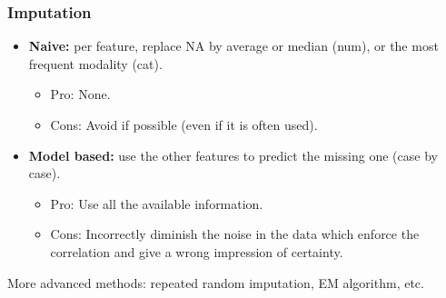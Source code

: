 \begin{frame}
\frametitle{Imputation}
\begin{itemize}
\item {\bf Naive:} per feature, replace NA by average or median (num), or the most frequent modality (cat). 
\begin{itemize}
\item Pro: None.
\item Cons: Avoid if possible (even if it is often used).
\end{itemize}
\item {\bf Model based:} use the other features to predict the missing one (case by case).
\begin{itemize}
\item Pro: Use all the available information.
\item Cons: Incorrectly diminish the noise in the data which enforce the correlation and give a wrong impression of certainty.
\end{itemize}
\end{itemize}
More advanced methods: repeated random imputation, EM algorithm, etc.
\end{frame}
